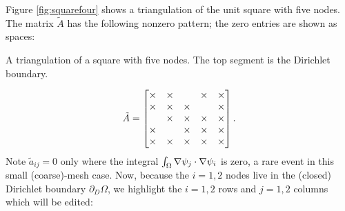 \medskip\noindent\hrulefill
\begin{example} Figure \ref{fig:squarefour} shows a triangulation of the unit square with five nodes.  The matrix $\tilde A$ has the following nonzero pattern; the zero entries are shown as spaces:\begin{marginfigure}

\caption{A triangulation of a square with five nodes.  The top segment is the Dirichlet boundary.}
\label{fig:squarefour}
\end{marginfigure}%
\begin{equation*}
\tilde A = \begin{bmatrix}
\times & \times &    & \times & \times \\
\times & \times & \times &    & \times \\
   & \times & \times & \times & \times \\
\times &    & \times & \times & \times \\
\times & \times & \times & \times & \times
\end{bmatrix}.
\end{equation*}
Note $\tilde a_{ij}=0$ only where the integral $\int_\Omega \nabla \psi_j \cdot \nabla \psi_i$ is zero, a rare event in this small (coarse)-mesh case.  Now, because the $i=1,2$ nodes live in the (closed) Dirichlet boundary $\partial_D \Omega$, we highlight the $i=1,2$ rows and $j=1,2$ columns which will be edited:

\newcommand{\uX}{\underline{\X}}
\newcommand{\hX}{\widehat{\X}}


\end{example}

